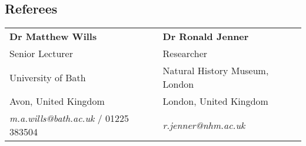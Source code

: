 \documentclass[margin,line]{resume}
\begin{document}
\begin{resume}
\section{\mysidestyle Referees} 

\begin{tabular}{@{}p{6cm}p{6cm}}
\textbf{Dr Matthew Wills}              &  \textbf{Dr Ronald Jenner}     \\
Senior Lecturer          &  Researcher      \\
University of Bath                     &  Natural History Museum, London    \\
Avon, United Kingdom           &  London, United Kingdom      \\
\textsl{m.a.wills@bath.ac.uk} / 01225 383504     &   \textsl{r.jenner@nhm.ac.uk}    \\

\end{tabular}


\end{resume}
\end{document}
